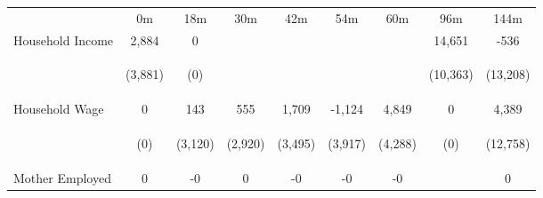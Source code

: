 \begin{tabular}{lcccccccc}
\hline \noalign{\smallskip} & 0m & 18m & 30m & 42m & 54m & 60m & 96m & 144m\\
\noalign{\smallskip}\hline \noalign{\smallskip}Household Income & 2,884 & 0 &  &  &  &  & 14,651 & -536\\
 & \begin{footnotesize}(3,881)\end{footnotesize} & \begin{footnotesize}(0)\end{footnotesize} & \begin{footnotesize}\end{footnotesize} & \begin{footnotesize}\end{footnotesize} & \begin{footnotesize}\end{footnotesize} & \begin{footnotesize}\end{footnotesize} & \begin{footnotesize}(10,363)\end{footnotesize} & \begin{footnotesize}(13,208)\end{footnotesize}\\
\noalign{\smallskip}Household Wage & 0 & 143 & 555 & 1,709 & -1,124 & 4,849 & 0 & 4,389\\
 & \begin{footnotesize}(0)\end{footnotesize} & \begin{footnotesize}(3,120)\end{footnotesize} & \begin{footnotesize}(2,920)\end{footnotesize} & \begin{footnotesize}(3,495)\end{footnotesize} & \begin{footnotesize}(3,917)\end{footnotesize} & \begin{footnotesize}(4,288)\end{footnotesize} & \begin{footnotesize}(0)\end{footnotesize} & \begin{footnotesize}(12,758)\end{footnotesize}\\
\noalign{\smallskip}Mother Employed & 0 & -0 & 0 & -0 & -0 & -0 &  & 0\\

\end{tabular}
